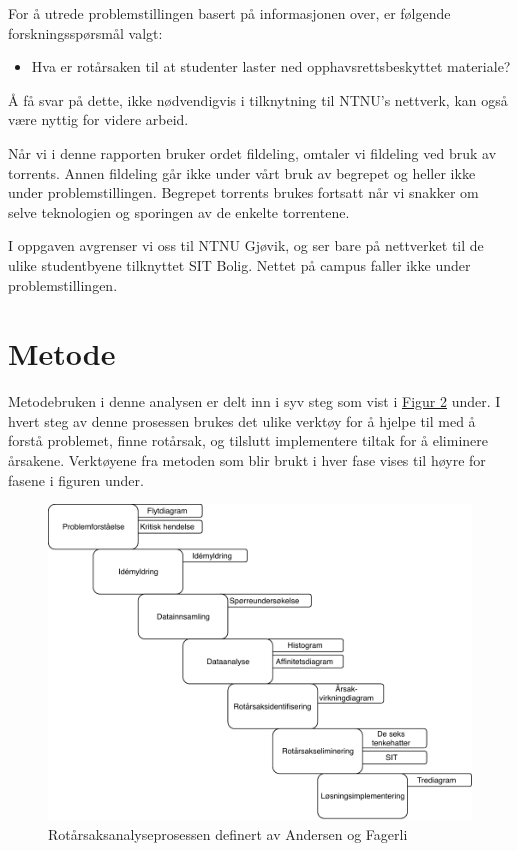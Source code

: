 For å utrede problemstillingen basert på informasjonen over, er følgende forskningsspørsmål valgt: 
\begin{itemize}
    \item Hva er rotårsaken til at studenter laster ned opphavsrettsbeskyttet materiale?
\end{itemize}

Å få svar på dette, ikke nødvendigvis i tilknytning til NTNU's nettverk, kan også være nyttig for videre arbeid.

Når vi i denne rapporten bruker ordet fildeling, omtaler vi fildeling ved bruk av torrents. Annen fildeling går ikke under vårt bruk av begrepet og heller ikke under problemstillingen. Begrepet torrents brukes fortsatt når vi snakker om selve teknologien og sporingen av de enkelte torrentene.

I oppgaven avgrenser vi oss til NTNU Gjøvik, og ser bare på nettverket til de ulike studentbyene tilknyttet SIT Bolig. Nettet på campus faller ikke under problemstillingen.

\section{Metode}
Metodebruken i denne analysen er delt inn i syv steg som vist i \hyperref[fig:prosess]{Figur 2} under. I hvert steg av denne prosessen brukes det ulike verktøy for å hjelpe til med å forstå problemet, finne rotårsak, og tilslutt implementere tiltak for å eliminere årsakene. Verktøyene fra metoden som blir brukt i hver fase vises til høyre for fasene i figuren under. 
\begin{figure}[H]
    \centering
    \includegraphics[scale=0.7]{case_1/bilder/Prosess_case_1.pdf}
    \caption[Rotårsaksanalyseprosessen]{Rotårsaksanalyseprosessen definert av Andersen og Fagerli}
    \label{fig:prosess-case1}
\end{figure}
